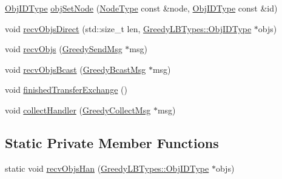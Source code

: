 \begin{DoxyCompactItemize}
\hyperlink{structvt_1_1vrt_1_1collection_1_1lb_1_1_base_l_b_a790b22acf448880599724749cdc4e9b3}{Obj\+I\+D\+Type} \hyperlink{structvt_1_1vrt_1_1collection_1_1lb_1_1_greedy_l_b_a38efce04a8fabdc16d89331b639f534f}{obj\+Set\+Node} (\hyperlink{namespacevt_a866da9d0efc19c0a1ce79e9e492f47e2}{Node\+Type} const \&node, \hyperlink{structvt_1_1vrt_1_1collection_1_1lb_1_1_base_l_b_a790b22acf448880599724749cdc4e9b3}{Obj\+I\+D\+Type} const \&id)
\item 
void \hyperlink{structvt_1_1vrt_1_1collection_1_1lb_1_1_greedy_l_b_a9d03bddd3f8266b68c4e0d0c8671f86e}{recv\+Objs\+Direct} (std\+::size\+\_\+t len, \hyperlink{structvt_1_1vrt_1_1collection_1_1lb_1_1_greedy_l_b_types_ae22670acd689e4ff83315fac2e4acb5e}{Greedy\+L\+B\+Types\+::\+Obj\+I\+D\+Type} $\ast$objs)
\item 
void \hyperlink{structvt_1_1vrt_1_1collection_1_1lb_1_1_greedy_l_b_a984461093fa3a1a5f8be9444d3e4c3f4}{recv\+Objs} (\hyperlink{structvt_1_1vrt_1_1collection_1_1lb_1_1_greedy_send_msg}{Greedy\+Send\+Msg} $\ast$msg)
\item 
void \hyperlink{structvt_1_1vrt_1_1collection_1_1lb_1_1_greedy_l_b_a0fce6ced2d28e1828ad5a414117f63c0}{recv\+Objs\+Bcast} (\hyperlink{structvt_1_1vrt_1_1collection_1_1lb_1_1_greedy_bcast_msg}{Greedy\+Bcast\+Msg} $\ast$msg)
\item 
void \hyperlink{structvt_1_1vrt_1_1collection_1_1lb_1_1_greedy_l_b_aa2cdba9feec93e48d7cce1886a4eaa6a}{finished\+Transfer\+Exchange} ()
\item 
void \hyperlink{structvt_1_1vrt_1_1collection_1_1lb_1_1_greedy_l_b_ab5942458625157b9baae1e06b453a547}{collect\+Handler} (\hyperlink{structvt_1_1vrt_1_1collection_1_1lb_1_1_greedy_collect_msg}{Greedy\+Collect\+Msg} $\ast$msg)
\end{DoxyCompactItemize}
\subsection*{Static Private Member Functions}
\begin{DoxyCompactItemize}
\item 
static void \hyperlink{structvt_1_1vrt_1_1collection_1_1lb_1_1_greedy_l_b_a2590d9a14ee124f30d86557f3cc5fb25}{recv\+Objs\+Han} (\hyperlink{structvt_1_1vrt_1_1collection_1_1lb_1_1_greedy_l_b_types_ae22670acd689e4ff83315fac2e4acb5e}{Greedy\+L\+B\+Types\+::\+Obj\+I\+D\+Type} $\ast$objs)
\end{DoxyCompactItemize}
